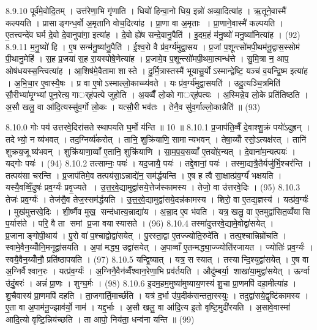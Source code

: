 8.9.10
पूर्व॑मे॒वोदि॒तम् । उत्त॑रेणा॒भि गृ॑णाति । धियो॑ हिन्वा॒नो धिय॒ इन्नो॑ अव्या॒दित्या॑ह । ऋ॒तूने॒वास्मै॑ कल्पयति । प्रासाङ्गन्ध॒र्वो अ॒मृता॑नि वोच॒दित्या॑ह । प्रा॒णा वा अ॒मृताः । प्रा॒णाने॒वास्मै॑ कल्पयति । ए॒तत्त्वन्दे॑व घर्म दे॒वो दे॒वानुपा॑गा॒ इत्या॑ह । दे॒वो ह्ये॑ष सन्दे॒वानु॒पैति॑ । इ॒दम॒हं म॑नु॒ष्यो॑ मनु॒ष्या॑नित्या॑ह । (92)
8.9.11
म॒नु॒ष्यो॑ हि । ए॒ष सन्म॑नु॒ष्या॑नु॒पैति॑ । ई॒श्व॒रो वै प्र॑व॒र्ग्य॑मुद्वा॒सय\sn{} । प्र॒जां प॒शून्त्सो॑मपी॒थम॑नू॒द्वास॒स्सोम॑ पी॒थानु॒मेहि॑ । स॒ह प्र॒जया॑ स॒ह रा॒यस्पोषे॒णेत्या॑ह । प्र॒जामे॒व प॒शून्त्सो॑मपी॒थमा॒त्मन्ध॑त्ते । सु॒मि॒त्रा न॒ आप॒ ओष॑धयस्स॒न्त्वित्या॑ह । आ॒शिष॑मे॒वैतामा शास्ते । दु॒र्मि॒त्रास्तस्मै॑ भूयासु॒र्योऽस्मान्द्वेष्टि॒ यञ्च॑ व॒यन्द्वि॒ष्म इत्या॑ह । अ॒भि॒चा॒र ए॒वास्यै॒षः । प्र वा ए॒षोऽस्माल्लो॒काच्च्य॑वते । यः प्र॑व॒र्ग्य॑मुद्वा॒सयति॑ । उदु॒त्यञ्चि॒त्रमिति॑ सौ॒रीभ्या॑मृ॒ग्भ्यां पुन॒रेत्य॒ गार््ह॑पत्ये जुहोति । अ॒यव्वैँ लो॒को गार््ह॑पत्यः । अ॒स्मिन्ने॒व लो॒के प्रति॑तिष्ठति । अ॒सौ खलु॒ वा आ॑दि॒त्यस्सु॑व॒र्गो लो॒कः । यत्सौ॒री भव॑तः । तेनै॒व सु॑व॒र्गाल्लो॒कान्नैति॑ ॥ (93)
\anuvakamend

8.10.0
गोः पय॑ उत्तरवे॒दिरा॑सते स्थापयति घ॒र्मो य॑न्ति ॥ 10 ॥
8.10.1
प्र॒जाप॑ति॒व्वैँ दे॒वाश्शु॒क्रं पयो॑ऽदुह्रन् । तदेभ्यो॒ न व्य॑भवत् । तद॒ग्निर्व्य॑करोत् । तानि॒ शुक्रि॑याणि॒ सामान्यभवन् । तेषा॒य्योँ रसो॒ऽत्यक्ष॑रत् । तानि॑ शुक्रय॒जूष्य॑भवन् । शुक्रि॑याणा॒व्वाँ ए॒तानि॒ शुक्रि॑याणि । सा॒म॒प॒य॒सव्वाँ ए॒तयो॑र॒न्यत् । दे॒वाना॑म॒न्यत्पयः॑ । यद्गोः पयः॑ । (94)
8.10.2
तत्साम्नः॒ पयः॑ । यद॒जायै॒ पयः॑ । तद्दे॒वानां॒ पयः॑ । तस्मा॒द्यत्रै॒तैर्यजु॑र्भि॒श्चर॑न्ति । तत्पय॑सा चरन्ति । प्र॒जाप॑तिमे॒व तत्पय॑सा॒ऽन्नाद्ये॑न॒ सम॑र्द्धयन्ति । ए॒ष ह त्वै सा॒क्षात्प्र॑व॒र्ग्यं॑ भक्षयति । यस्यै॒वव्विँ॒दुषः॑ प्रव॒र्ग्यः॑ प्रवृ॒ज्यते । उ॒त्त॒र॒वे॒द्यामुद्वा॑सये॒त्तेज॑स्कामस्य । तेजो॒ वा उ॑त्तरवे॒दिः । (95)
8.10.3
तेजः॑ प्रव॒र्ग्यः॑ । तेज॑सै॒व तेज॒स्सम॑र्द्धयति । उ॒त्त॒र॒वे॒द्यामुद्वा॑सये॒दन्न॑कामस्य । शिरो॒ वा ए॒तद्य॒ज्ञस्य॑ । यत्प्र॑व॒र्ग्यः॑ । मुख॑मुत्तरवे॒दिः । शी॒र्ष्णैव मुख॒ सन्द॑धात्य॒न्नाद्या॑य । अ॒न्ना॒द ए॒व भ॑वति । यत्र॒ खलु॒ वा ए॒तमुद्वा॑सित॒व्वँयासि प॒र्यास॑ते । परि॒ वै ता समां प्र॒जा वयास्यासते । (96)
8.10.4
तस्मा॑दुत्तरवे॒द्यामे॒वोद्वा॑सयेत् । प्र॒जानाङ्गोपी॒थाय॑ । पु॒रो वा॑ प॒श्चाद्वोद्वा॑सयेत् । पु॒रस्ता॒द्वा ए॒तज्ज्योति॒रुदे॑ति । तत्प॒श्चान्निम्रो॑चति । स्वामे॒वैन॒य्योँनि॒मनूद्वा॑सयति । अ॒पां मद्ध्य॒ उद्वा॑सयेत् । अ॒पाव्वाँ ए॒तन्मद्ध्या॒ज्ज्योति॑रजायत । ज्योतिः॑ प्रव॒र्ग्यः॑ । स्वयै॒वैन॒य्योँनौ॒ प्रति॑ष्ठापयति । (97)
8.10.5
यन्द्वि॒ष्यात् । यत्र॒ स स्यात् । तस्यान्दि॒श्युद्वा॑सयेत् । ए॒ष वा अ॒ग्निर्वैश्वान॒रः । यत्प्र॑व॒र्ग्यः॑ । अ॒ग्निनै॒वैन॑व्वैँश्वान॒रेणा॒भि प्रव॑र्तयति । औदु॑म्बर्या॒ शाखा॑या॒मुद्वा॑सयेत् । ऊर्ग्वा उ॑दुं॒बरः॑ । अन्नं॑ प्रा॒णः । शुग्घ॒र्मः । (98)
8.10.6
इ॒दम॒हम॒मुष्या॑मुष्याय॒णस्य॑ शु॒चा प्रा॒णमपि॑ दहा॒मीत्या॑ह । शु॒चैवास्य॑ प्रा॒णमपि॑ दहति । ता॒जगार्ति॒मार्च्छ॑ति । यत्र॑ द॒र्भा उ॑प॒दीक॑सन्तता॒स्स्युः । तदुद्वा॑सये॒द्वृष्टि॑कामस्य । ए॒ता वा अ॒पाम॑नू॒ज्झाव॑र्यो॒ नाम॑ । यद्द॒र्भाः । अ॒सौ खलु॒ वा आ॑दि॒त्य इ॒तो वृष्टि॒मुदी॑रयति । अ॒सावे॒वास्मा॑ आदि॒त्यो वृष्टि॒न्निय॑च्छति । ता आपो॒ निय॑ता॒ धन्व॑ना यन्ति ॥ (99)
\anuvakamend

